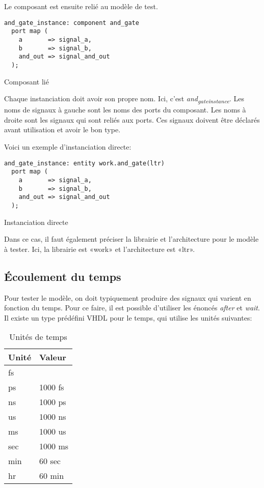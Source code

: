 \documentclass[11pt]{article}
\begin{document}
Le composant est ensuite relié au modèle de test. 

\begin{listing}[htbp]
\begin{verbatim}
and_gate_instance: component and_gate
  port map (
    a       => signal_a,
    b       => signal_b,
    and_out => signal_and_out
  );
\end{verbatim}
\caption{Composant lié}
\end{listing}

Chaque instanciation doit avoir son propre nom. Ici, c'est
\emph{and\textsubscript{gate}\textsubscript{instance}}. Les noms de signaux à gauche sont les noms des
ports du composant. Les noms à droite sont les signaux qui sont reliés
aux ports. Ces signaux doivent être déclarés avant utilisation et
avoir le bon type.

Voici un exemple d'instanciation directe:

\begin{listing}[htbp]
\begin{verbatim}
and_gate_instance: entity work.and_gate(ltr)
  port map (
    a       => signal_a,
    b       => signal_b,
    and_out => signal_and_out
  );
\end{verbatim}
\caption{Instanciation directe}
\end{listing}

Dans ce cas, il faut également préciser la librairie et l'architecture
pour le modèle à tester. Ici, la librairie est «work» et
l'architecture est «ltr».

\subsection{Écoulement du temps}
\label{sec:org41d6229}

Pour tester le modèle, on doit typiquement produire des signaux qui
varient en fonction du temps. Pour ce faire, il est possible
d'utiliser les énoncés \emph{after} et \emph{wait}. Il existe un type prédéfini
VHDL pour le temps, qui utilise les unités suivantes:

\begin{table}[htbp]
\caption{\label{tab:org0327a10}Unités de temps}
\centering
\begin{tabular}{ll}
Unité & Valeur\\[0pt]
\hline
fs & \\[0pt]
ps & 1000 fs\\[0pt]
ns & 1000 ps\\[0pt]
us & 1000 ns\\[0pt]
ms & 1000 us\\[0pt]
sec & 1000 ms\\[0pt]
min & 60 sec\\[0pt]
hr & 60 min\\[0pt]
\end{tabular}
\end{table}
\end{document}
